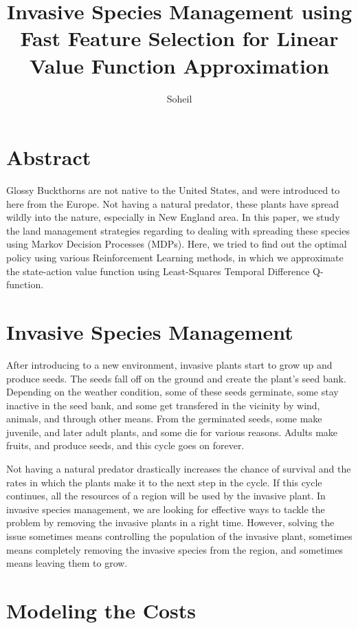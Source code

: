 \documentclass{article}
\title{Invasive Species Management using Fast Feature Selection for Linear Value Function Approximation}
\author{Soheil}
\date{}
\theoremstyle{remark}
\theoremstyle{remark}
\theoremstyle{remark}
\theoremstyle{remark}
\theoremstyle{remark}
\theoremstyle{remark}
\begin{document}
\maketitle

\section*{Abstract}
Glossy Buckthorns are not native to the United States, and were introduced to here from the Europe. Not having a natural predator, these plants have spread wildly into the nature, especially in New England area. In this paper, we study the land management strategies regarding to dealing with spreading these species using Markov Decision Processes (MDPs). Here, we tried to find out the optimal policy using various Reinforcement Learning methods, in which we approximate the state-action value function using Least-Squares Temporal Difference Q-function.

\section*{Invasive Species Management}

After introducing to a new environment, invasive plants start to grow up and produce seeds. The seeds fall off on the ground and create the plant's seed bank. Depending on the weather condition, some of these seeds germinate, some stay inactive in the seed bank, and some get transfered in the vicinity by wind, animals, and through other means. From the germinated seeds, some make juvenile, and later adult plants, and some die for various reasons. Adults make fruits, and produce seeds, and this cycle goes on forever.

Not having a natural predator drastically increases the chance of survival and the rates in which the plants make it to the next step in the cycle. If this cycle continues, all the resources of a region will be used by the invasive plant. In invasive species management, we are looking for effective ways to tackle the problem by removing the invasive plants in a right time. However, solving the issue sometimes means controlling the population of the invasive plant, sometimes means completely removing the invasive species from the region, and sometimes means leaving them to grow. 

\section*{Modeling the Costs}
\end{document}
